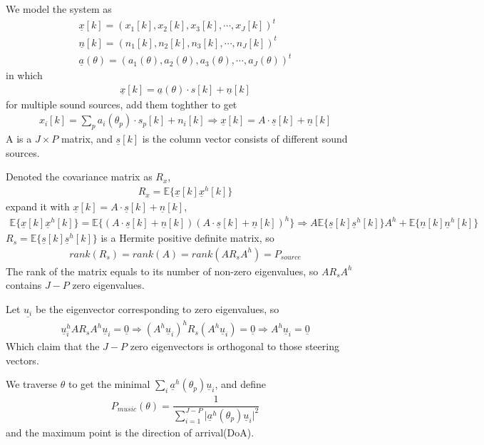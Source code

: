 \documentclass[UTF8]{article}
\newcommand{\ul}{\underline}
\begin{document}
We model the system as
\begin{gather*}
    \ul{x}[k] = (x_1[k], x_2[k], x_3[k], \cdots, x_J[k])^t \\
    \ul{n}[k] = (n_1[k], n_2[k], n_3[k], \cdots, n_J[k])^t \\
    \ul{a}(\theta) = (a_1(\theta), a_2(\theta), a_3(\theta), \cdots, a_J(\theta))^t
\end{gather*}
in which 
\begin{gather}
    \ul{x}[k] = \ul{a}(\theta)\cdot s[k] + \ul{n}[k]
\end{gather}
for multiple sound sources, add them toghther to get
\begin{gather}
    x_i[k] = \sum_{p}a_i(\theta_p)\cdot s_p[k] + n_i[k] \Rightarrow \ul{x}[k] = A \cdot \ul{s}[k] + \ul{n}[k]
\end{gather}
A is a $J \times P$ matrix, and $\ul{s}[k]$ is the column vector consists of different sound sources.

Denoted the covariance matrix as $R_x$, 
\begin{gather}
   R_x = \mathbb{E}\{\ul{x}[k]\ul{x}^h[k]\} 
\end{gather}
expand it with $\ul{x}[k] = A \cdot \ul{s}[k] + \ul{n}[k]$, 
\begin{gather}
    \mathbb{E}\{\ul{x}[k]\ul{x}^h[k]\} = \mathbb{E} \{ (A \cdot \ul{s}[k] + \ul{n}[k])(A \cdot \ul{s}[k] + \ul{n}[k])^h \} \Rightarrow A \mathbb{E}\{ \ul{s}[k]\ul{s}^h[k] \}A^h + \mathbb{E}\{ \ul{n}[k] \ul{n}^h[k]\}
\end{gather}
$R_s = \mathbb{E}\{ \ul{s}[k]\ul{s}^h[k] \}$ is a Hermite positive definite matrix, so 
\begin{gather*}
    rank(R_s) = rank(A) = rank(A R_s A^h) = P_{source}
\end{gather*}
The rank of the matrix equals to its number of non-zero eigenvalues, so $A R_s A^h$ contains $J - P$ zero eigenvalues. 

Let $\ul{u_i}$ be the eigenvector corresponding to zero eigenvalues, so 
\begin{gather}
    \ul{u}_i^h A R_s A^h \ul{u}_i = \ul{0} \Rightarrow (A^h\ul{u}_i)^h R_s (A^h \ul{u}_i) = \ul{0} \Rightarrow A^h\ul{u}_i = \ul{0}
\end{gather}
Which claim that the $J - P$ zero eigenvectors is orthogonal to those steering vectors.

We traverse $\theta$ to get the minimal $\sum_{i}\ul{a}^h(\theta_p)\ul{u}_i$, and define
\begin{gather}
    P_{music}(\theta) = \dfrac{1}{\sum_{i = 1}^{J - P}\big|\ul{a}^h(\theta_p)\ul{u}_i \big|^2}
\end{gather}
and the maximum point is the direction of arrival(DoA).
\end{document}
